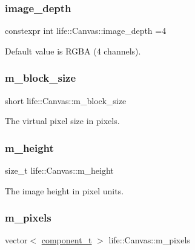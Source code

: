 \subsubsection{\texorpdfstring{image\_depth}{image\_depth}}
{\footnotesize\ttfamily constexpr int life\+::\+Canvas\+::image\+\_\+depth =4\hspace{0.3cm}{\ttfamily [static]}}



Default value is R\+G\+BA (4 channels). 

\mbox{\label{classlife_1_1_canvas_aea389d8a5d0c86654c7fb70c709dc40f}} 
\subsubsection{\texorpdfstring{m\_block\_size}{m\_block\_size}}
{\footnotesize\ttfamily short life\+::\+Canvas\+::m\+\_\+block\+\_\+size\hspace{0.3cm}{\ttfamily [private]}}



The virtual pixel size in pixels. 

\mbox{\label{classlife_1_1_canvas_abe558e631ac0d987ead64bb181b9c1df}} 
\subsubsection{\texorpdfstring{m\_height}{m\_height}}
{\footnotesize\ttfamily size\+\_\+t life\+::\+Canvas\+::m\+\_\+height\hspace{0.3cm}{\ttfamily [private]}}



The image height in pixel units. 

\mbox{\label{classlife_1_1_canvas_acf072584d87267af3da4c3416c93362e}} 
\subsubsection{\texorpdfstring{m\_pixels}{m\_pixels}}
{\footnotesize\ttfamily vector$<$ \mbox{\hyperlink{classlife_1_1_canvas_aa0de8894cefde751c08728d25e75a911}{component\+\_\+t}} $>$ life\+::\+Canvas\+::m\+\_\+pixels\hspace{0.3cm}{\ttfamily [private]}}



